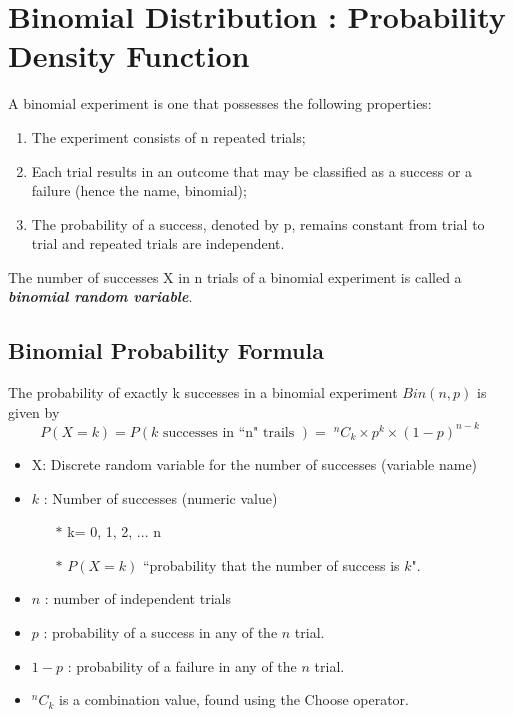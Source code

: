 \documentclass[a4paper,12pt]{article}
\begin{document}
\section*{Binomial Distribution : Probability Density Function}
A binomial experiment is one that possesses the following properties:

\begin{enumerate}
	\item The experiment consists of n repeated trials;
	
\item Each trial results in an outcome that may be classified as a success or a failure (hence the name, binomial);
	
\item The probability of a success, denoted by p, remains constant from trial to trial and repeated trials are independent.
\end{enumerate}


\noindent 
The number of successes X in n trials of a binomial experiment is called a \textbf{\textit{binomial random variable}}.


\subsection*{Binomial Probability Formula}
The probability of exactly k successes in a binomial experiment $Bin(n, p)$ is given by
\[ P(X=k) = P(k \mbox{ successes in ``n" trails }) = \;^nC_k  \times p^{k} \times (1-p)^{n-k}\]

\begin{itemize}
	\item X: Discrete random variable for the number of successes (variable name)
	\item $k$ : Number of successes (numeric value)
	\begin{itemize}
		
		\item[$\ast$]  k= 0, 1, 2, ... n
		\item[$\ast$]   $P(X=k)$ ``probability that the number of success is $k$".
	\end{itemize}
	\item $n$ : number of independent trials
	\item $p$ : probability of a success in any of the $n$ trial.
	\item $1-p$ : probability of a failure in any of the $n$ trial.
	\item ${^nC_k}$ is a combination value, found using the Choose operator.
\end{itemize}
\end{document}
